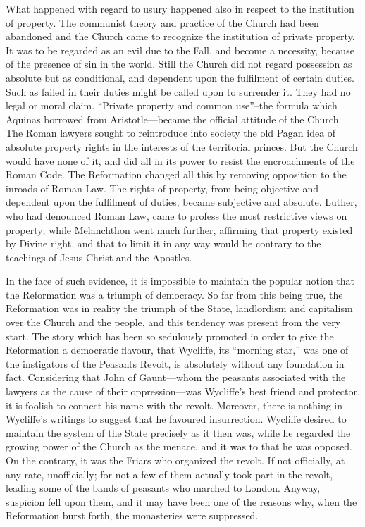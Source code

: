 \documentclass{book}
\begin{document}
What happened with regard to usury happened also in respect to the institution of property. The communist theory and practice of the Church had been abandoned and the Church came to recognize the institution of private property. It was to be regarded as an evil due to the Fall, and become a necessity, because of the presence of sin in the world. Still the Church did not regard possession as absolute but as conditional, and dependent upon the fulfilment of certain duties. Such as failed in their duties might be called upon to surrender it. They had no legal or moral claim. “Private property and common use”–the formula which Aquinas borrowed from Aristotle—became the official attitude of the Church. The Roman lawyers sought to reintroduce into society the old Pagan idea of absolute property rights in the interests of the territorial princes. But the Church would have none of it, and did all in its power to resist the encroachments of the Roman Code. The Reformation changed all this by removing opposition to the inroads of Roman Law. The rights of property, from being objective and dependent upon the fulfilment of duties, became subjective and absolute. Luther, who had denounced Roman Law, came to profess the most restrictive views on property; while Melanchthon went much further, affirming that property existed by Divine right, and that to limit it in any way would be contrary to the teachings of Jesus Christ and the Apostles.

In the face of such evidence, it is impossible to maintain the popular notion that the Reformation was a triumph of democracy. So far from this being true, the Reformation was in reality the triumph of the State, landlordism and capitalism over the Church and the people, and this tendency was present from the very start. The story which has been so sedulously promoted in order to give the Reformation a democratic flavour, that Wycliffe, its “morning star,” was one of the instigators of the Peasants Revolt, is absolutely without any foundation in fact. Considering that John of Gaunt—whom the peasants associated with the lawyers as the cause of their oppression—was Wycliffe’s best friend and protector, it is foolish to connect his name with the revolt. Moreover, there is nothing in Wycliffe’s writings to suggest that he favoured insurrection. Wycliffe desired to maintain the system of the State precisely as it then was, while he regarded the growing power of the Church as the menace, and it was to that he was opposed. On the contrary, it was the Friars who organized the revolt. If not officially, at any rate, unofficially; for not a few of them actually took part in the revolt, leading some of the bands of peasants who marched to London. Anyway, suspicion fell upon them, and it may have been one of the reasons why, when the Reformation burst forth, the monasteries were suppressed.
\end{document}
